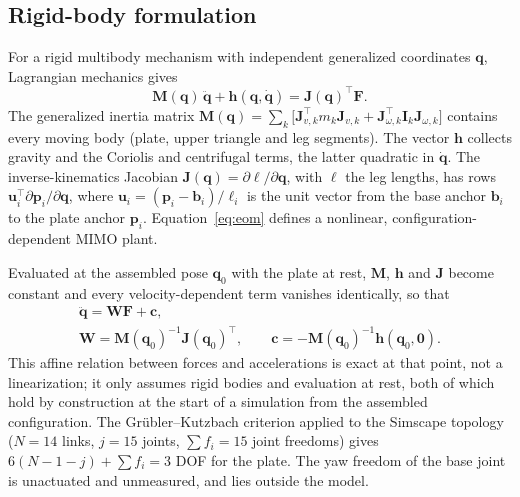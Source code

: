\documentclass[]{IAC_style}
\newcommand{\W}{\bm{W}}
\newcommand{\Mmat}{\bm{M}}
\newcommand{\Jmat}{\bm{J}}
\newcommand{\qv}{\bm{q}}
\newcommand{\Fv}{\bm{F}}
\newcommand{\cv}{\bm{c}}
\begin{document}
\subsection{Rigid-body formulation}
For a rigid multibody mechanism with independent generalized coordinates $\qv$, Lagrangian mechanics gives \cite{merlet2006}
\begin{equation}
\Mmat(\qv)\,\ddot{\qv}+\bm{h}(\qv,\dot{\qv})=\Jmat(\qv)^\top\Fv .
\label{eq:eom}
\end{equation}
The generalized inertia matrix $\Mmat(\qv)=\sum_k\big[\Jmat_{v,k}^\top m_k\Jmat_{v,k}+\Jmat_{\omega,k}^\top\bm{I}_k\Jmat_{\omega,k}\big]$ contains every moving body (plate, upper triangle and leg segments). The vector $\bm{h}$ collects gravity and the Coriolis and centrifugal terms, the latter quadratic in $\dot{\qv}$. The inverse-kinematics Jacobian $\Jmat(\qv)=\partial\bm{\ell}/\partial\qv$, with $\bm{\ell}$ the leg lengths, has rows $\bm{u}_i^\top\partial\bm{p}_i/\partial\qv$, where $\bm{u}_i=(\bm{p}_i-\bm{b}_i)/\ell_i$ is the unit vector from the base anchor $\bm{b}_i$ to the plate anchor $\bm{p}_i$. Equation~\eqref{eq:eom} defines a nonlinear, configuration-dependent MIMO plant.

Evaluated at the assembled pose $\qv_0$ with the plate at rest, $\Mmat$, $\bm{h}$ and $\Jmat$ become constant and every velocity-dependent term vanishes identically, so that
\begin{equation}
\begin{gathered}
\ddot{\qv}=\W\Fv+\cv,\\
\W=\Mmat(\qv_0)^{-1}\Jmat(\qv_0)^\top,\qquad \cv=-\Mmat(\qv_0)^{-1}\bm{h}(\qv_0,\bm{0}).
\end{gathered}
\label{eq:affine}
\end{equation}
This affine relation between forces and accelerations is exact at that point, not a linearization; it only assumes rigid bodies and evaluation at rest, both of which hold by construction at the start of a simulation from the assembled configuration. The Gr\"ubler--Kutzbach criterion applied to the Simscape topology ($N=14$ links, $j=15$ joints, $\sum f_i=15$ joint freedoms) gives $6(N-1-j)+\sum f_i=3$ DOF for the plate. The yaw freedom of the base joint is unactuated and unmeasured, and lies outside the model.
\end{document}
